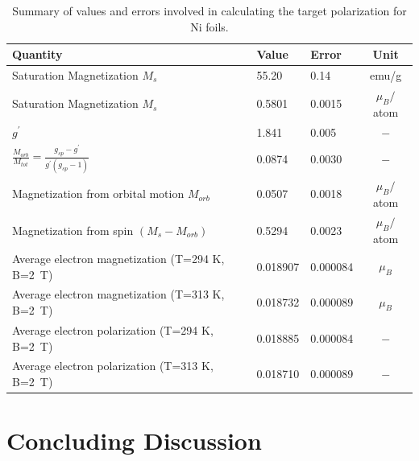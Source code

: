 \documentclass[12pt]{article}
\begin{document}
\begin{table}[h]
\begin{center}
\begin{tabular}{|l|l|l|c|}\hline
Quantity&Value&Error&Unit\\\hline
Saturation Magnetization $M_s$&55.20&0.14&emu/g\\
Saturation Magnetization $M_s$&0.5801&0.0015&$\mu_B/$atom\\
$g^{\prime}$&1.841&0.005&$-$\\
$\frac{M_{orb}}{M_{tot}}=\frac{g_{sp}-g^{\prime}}{g^{\prime}(g_{sp}-1)}$&0.0874&0.0030&$-$\\
Magnetization from orbital motion $M_{orb}$&0.0507&0.0018&$\mu_B/$atom\\
Magnetization from spin $(M_s-M_{orb})$&0.5294&0.0023&$\mu_B/$atom\\
Average electron magnetization (T=294 K, B=2~T)&0.018907&0.000084&$\mu_B$\\
Average electron magnetization (T=313 K, B=2~T)&0.018732&0.000089&$\mu_B$\\
Average electron polarization (T=294 K, B=2~T)&0.018885&0.000084&$-$\\
Average electron polarization (T=313 K, B=2~T)&0.018710&0.000089&$-$\\\hline
\end{tabular}
\end{center}
\caption{\label{tab:final_errors_Ni}Summary of values and errors involved in calculating the target polarization for Ni foils.}

\section{Concluding Discussion}\label{conclusions}
\end{table}
\FloatBarrier
%


\end{document}
